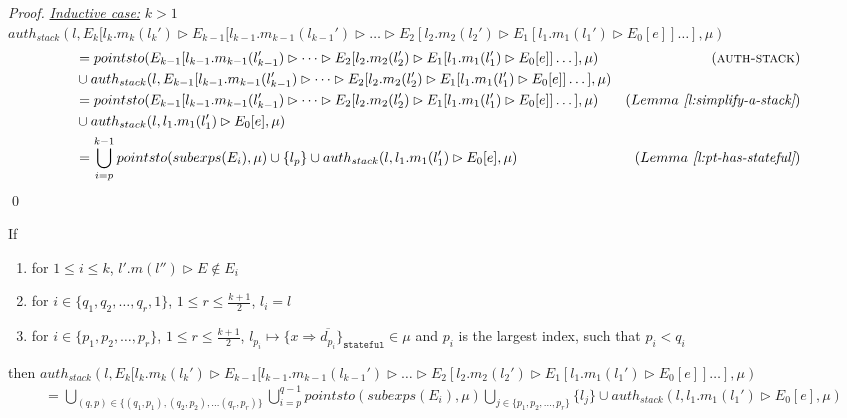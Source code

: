 \documentclass{llncs}
\newcommand{\keywadj}[1]{\mathtt{#1}}
\begin{document}
\begin{proof}
\noindent\underline{\textit{Inductive case:}} $k > 1$\\
\noindent$auth_{stack}(l, E_k[l_k.m_k(l_k') \rhd E_{k-1}[l_{k-1}.m_{k-1}(l_{k-1}') \rhd \dots \rhd E_2[l_2.m_2(l_2') \rhd E_1[l_1.m_1(l_1') \rhd E_0[e]] \dots ], \mu)$
\vspace{-7pt}
\begin{align*}
&=  pointsto(E_{k-1}[l_{k-1}.m_{k-1}(l_{k-1}') \rhd \dots \rhd E_2[l_2.m_2(l_2') \rhd E_1[l_1.m_1(l_1') \rhd E_0[e]] \dots ], \mu) & (\textsc{auth-stack})\\
&\cup auth_{stack}(l, E_{k-1}[l_{k-1}.m_{k-1}(l_{k-1}') \rhd \dots \rhd E_2[l_2.m_2(l_2') \rhd E_1[l_1.m_1(l_1') \rhd E_0[e]] \dots ], \mu)\\
&=  pointsto(E_{k-1}[l_{k-1}.m_{k-1}(l_{k-1}') \rhd \dots \rhd E_2[l_2.m_2(l_2') \rhd E_1[l_1.m_1(l_1') \rhd E_0[e]] \dots ], \mu) & (Lemma~\textit{\ref{l:simplify-a-stack}})\\
&\cup auth_{stack}(l, l_1.m_1(l_1') \rhd E_0[e], \mu)\\
&= \bigcup^{k-1}_{i = p} pointsto(subexps(E_i), \mu) \cup \{ l_p \} \cup auth_{stack}(l, l_1.m_1(l_1') \rhd E_0[e], \mu) & (Lemma~\textit{\ref{l:pt-has-stateful}})
\end{align*}
\qed
\end{proof}


\begin{mdframed}
\begin{lemma}
\label{l:six}
If
\begin{enumerate}
\item for $1 \leq i \leq k$, $l'.m(l'') \rhd E \not\in E_i$
\item for $i \in \{ q_1, q_2, \dots, q_r, 1 \}$, $1 \leq r \leq \frac{k+1}{2}$, $l_i = l$
\item for $i \in \{ p_1, p_2, \dots, p_r\}$, $1 \leq r \leq \frac{k+1}{2}$, $l_{p_i} \mapsto \{ x \Rightarrow \overline{d_{p_i}} \}_{\keywadj{stateful}} \in \mu$ and $p_i$ is the largest index, such that $p_i < q_i$
\end{enumerate}
then
\noindent$auth_{stack}(l, E_k[l_k.m_k(l_k') \rhd E_{k-1}[l_{k-1}.m_{k-1}(l_{k-1}') \rhd \dots \rhd E_2[l_2.m_2(l_2') \rhd E_1[l_1.m_1(l_1') \rhd E_0[e]] \dots ], \mu)$
\vspace{-7pt}
\begin{align*}
&=  \bigcup_{(q, p) \in \{ (q_1, p_1), (q_2, p_2), \dots (q_r, p_r) \}} \bigcup^{q-1}_{i = p} pointsto(subexps(E_i), \mu) \bigcup_{j \in \{ p_1, p_2, \dots, p_r \}} \{ l_j \} \cup auth_{stack}(l, l_1.m_1(l_1') \rhd E_0[e], \mu)
\end{align*}
\end{lemma}
\end{mdframed}
\end{document}
